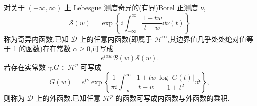对关于 $(-\infty, \infty)$ 上 Lebesgue 测度奇异的(有界)Borel 正测度 $\nu$,
\begin{equation*}
\mathcal{S}(w) = \exp\left\{i\int_{-\infty}^{\infty}\frac{1 + tw}{t - w}\dd \nu(t)\right\}
\end{equation*}
称为奇异内函数.已知 $\mathcal{D}$ 上的任意内函数(即属于 $\mathcal{H}^{\infty}$,其边界值几乎处处绝对值等于 1 的函数)存在常数 $\alpha \geq 0$,可写成
\begin{equation*}
e^{i\alpha w}\mathcal{B}(w)\mathcal{S}(w).
\end{equation*}
若存在实常数 $\gamma$,$G \in \mathcal{H}^{p}$ 可写成
\begin{equation*}
G(w) = e^{i\gamma}\exp\left\{\frac{1}{\pi i}\int_{-\infty}^{\infty}\frac{1 + tw}{t - w}\frac{\log|G(t)|}{1 + t^{2}}\dd t \right\},
\end{equation*}
则称为 $\mathcal{D}$ 上的外函数.已知任意 $\mathcal{H}^{p}$ 的函数可写成内函数与外函数的乘积.
